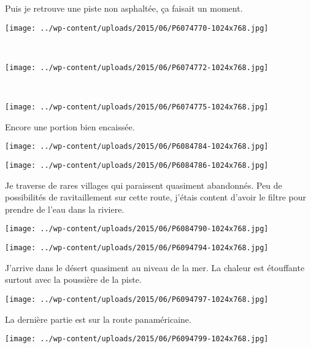 \vspace{-\topsep}
\vspace{-1.25mm}
\pagebreak
Puis je retrouve une piste non asphaltée, ça faisait un moment. 
\begin{center} \texttt{[image: ../wp-content/uploads/2015/06/P6074770-1024x768.jpg]} \end{center}
~
\begin{center} \texttt{[image: ../wp-content/uploads/2015/06/P6074772-1024x768.jpg]} \end{center}
\vspace{-\topsep}
\pagebreak
~
\begin{center} \texttt{[image: ../wp-content/uploads/2015/06/P6074775-1024x768.jpg]} \end{center}

Encore une portion bien encaissée. 
\begin{center} \texttt{[image: ../wp-content/uploads/2015/06/P6084784-1024x768.jpg]} \end{center}
\begin{center} \texttt{[image: ../wp-content/uploads/2015/06/P6084786-1024x768.jpg]} \end{center}

Je traverse de rares villages qui paraissent quasiment abandonnés. Peu de possibilités de ravitaillement sur cette route, j'étais content d'avoir le filtre pour prendre de l'eau dans la riviere. 
\begin{center} \texttt{[image: ../wp-content/uploads/2015/06/P6084790-1024x768.jpg]} \end{center}
\begin{center} \texttt{[image: ../wp-content/uploads/2015/06/P6094794-1024x768.jpg]} \end{center}

J'arrive dans le désert quasiment au niveau de la mer. La chaleur est étouffante surtout avec la poussière de la piste. 
\begin{center} \texttt{[image: ../wp-content/uploads/2015/06/P6094797-1024x768.jpg]} \end{center}
\vspace{-\topsep}
\pagebreak
La dernière partie est sur la route panaméricaine. 
\begin{center} \texttt{[image: ../wp-content/uploads/2015/06/P6094799-1024x768.jpg]} \end{center}

